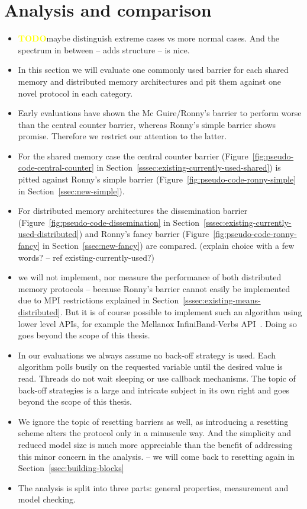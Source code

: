 \documentclass[a4paper, 10pt]{article}
\def \todo{\textbf{\textcolor{yellow}{TODO}}}
\begin{document}
\section{Analysis and comparison}
\label{sec:analysis}
\begin{itemize}
	\item \todo maybe distinguish extreme cases vs more normal cases. And the spectrum in between -- adds structure -- is nice.
	\item In this section we will evaluate one commonly used barrier for each shared memory and distributed memory architectures and pit them against one novel protocol in each category.
	\item Early evaluations have shown the Mc Guire/Ronny's barrier to perform worse than the central counter barrier, whereas Ronny's simple barrier shows promise. Therefore we restrict our attention to the latter.
	\item For the shared memory case the central counter barrier (Figure~\ref{fig:pseudo-code-central-counter} in Section~\ref{sssec:existing-currently-used-shared}) is pitted against Ronny's simple barrier (Figure~\ref{fig:pseudo-code-ronny-simple} in Section~\ref{ssec:new-simple}).
	\item For distributed memory architectures the dissemination barrier (Figure~\ref{fig:pseudo-code-dissemination} in Section~\ref{sssec:existing-currently-used-distributed}) and Ronny's fancy barrier (Figure~\ref{fig:pseudo-code-ronny-fancy} in Section~\ref{ssec:new-fancy}) are compared. (explain choice with a few words? -- ref existing-currently-used?)
	\item we will not implement, nor measure the performance of both distributed memory protocols -- because Ronny's barrier cannot easily be implemented due to MPI restrictions explained in Section~\ref{sssec:existing-means-distributed}. But it is of course possible to implement such an algorithm using lower level APIs, for example the Mellanox InfiniBand-Verbs API~\cite{mellanox}. Doing so goes beyond the scope of this thesis.
	\item In our evaluations we always assume no back-off strategy is used. Each algorithm polls busily on the requested variable until the desired value is read. Threads do not wait sleeping or use callback mechanisms. The topic of back-off strategies is a large and intricate subject in its own right and goes beyond the scope of this thesis.
	\item We ignore the topic of resetting barriers as well, as introducing a resetting scheme alters the protocol only in a minuscule way. And the simplicity and reduced model size is much more appreciable than the benefit of addressing this minor concern in the analysis. -- we will come back to resetting again in Section~\ref{ssec:building-blocks}
	\item The analysis is split into three parts: general properties, measurement and model checking.
\end{itemize}
\end{document}
